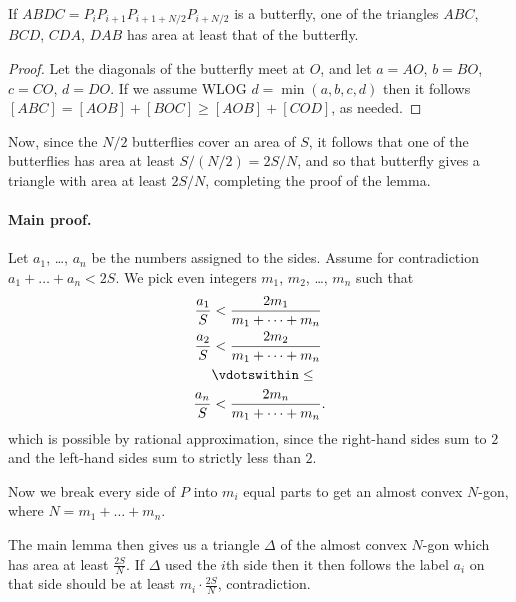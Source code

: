 \documentclass[11pt]{scrartcl}
\begin{document}
\begin{claim*}
  If $ABDC = P_i P_{i+1} P_{i+1+N/2} P_{i+N/2}$ is a butterfly,
  one of the triangles $ABC$, $BCD$, $CDA$, $DAB$
  has area at least that of the butterfly.
\end{claim*}
\begin{proof}
  Let the diagonals of the butterfly meet at $O$,
  and let $a = AO$, $b = BO$, $c = CO$, $d = DO$.
  If we assume WLOG $d = \min(a,b,c,d)$
  then it follows $[ABC] = [AOB] + [BOC] \ge [AOB] + [COD]$, as needed.
\end{proof}

Now, since the $N/2$ butterflies cover an area of $S$,
it follows that one of the butterflies
has area at least $S / (N/2) = 2S/N$,
and so that butterfly gives a triangle with area at least $2S/N$,
completing the proof of the lemma.

\paragraph{Main proof.}
Let $a_1$, \dots, $a_n$ be the numbers assigned to the sides.
Assume for contradiction $a_1 + \dots + a_n < 2S$.
We pick even integers $m_1$, $m_2$, \dots, $m_n$ such that
\begin{align*}
  \frac{a_1}{S} &< \frac{2m_1}{m_1 + \dots + m_n} \\
  \frac{a_2}{S} &< \frac{2m_2}{m_1 + \dots + m_n} \\
  &\vdotswithin\le \\
  \frac{a_n}{S} &< \frac{2m_n}{m_1 + \dots + m_n}.
\end{align*}
which is possible by rational approximation,
since the right-hand sides sum to $2$ and the left-hand sides sum to strictly less than $2$.

Now we break every side of $P$ into $m_i$ equal parts
to get an almost convex $N$-gon, where $N = m_1 + \dots + m_n$.

The main lemma then gives us a triangle $\Delta$ of the almost convex $N$-gon
which has area at least $\frac{2S}{N}$.
If $\Delta$ used the $i$th side then it then follows the label $a_i$ on that side should be
at least $m_i \cdot \frac{2S}{N}$, contradiction.
\pagebreak
\end{document}
